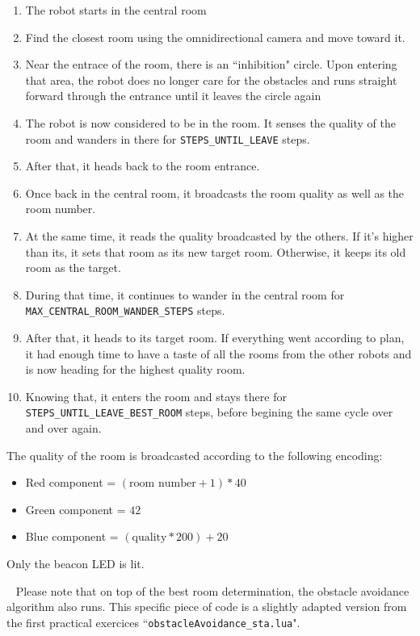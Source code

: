 \documentclass[11pt, a4paper]{article}
\begin{document}
\begin{enumerate}
	\item The robot starts in the central room
	\item Find the closest room using the omnidirectional camera and move toward it.
	\item Near the entrace of the room, there is an ``inhibition" circle. Upon entering that area, the robot does no longer care for the obstacles and runs straight forward through the entrance until it leaves the circle again
	\item The robot is now considered to be in the room. It senses the quality of the room and wanders in there for \texttt{STEPS\_UNTIL\_LEAVE} steps.
	\item After that, it heads back to the room entrance.
	\item Once back in the central room, it broadcasts the room quality as well as the room number.
	\item At the same time, it reads the quality broadcasted by the others. If it's higher than its, it sets that room as its new target room. Otherwise, it keeps its old room as the target.
	\item During that time, it continues to wander in the central room for\newline{} \texttt{MAX\_CENTRAL\_ROOM\_WANDER\_STEPS} steps.
	\item After that, it heads to its target room. If everything went according to plan, it had enough time to have a taste of all the rooms from the other robots and is now heading for the highest quality room.
	\item Knowing that, it enters the room and stays there for\newline{} \texttt{STEPS\_UNTIL\_LEAVE\_BEST\_ROOM} steps, before begining the same cycle over and over again.
\end{enumerate}

The quality of the room is broadcasted according to the following encoding:
\begin{itemize}
	\item Red component = $(\mbox{room number} + 1) * 40$
	\item Green component = $42$
	\item Blue component = $(\mbox{quality}*200)+20$
\end{itemize}
Only the beacon LED is lit.



~\newline{}
Please note that on top of the best room determination, the obstacle avoidance algorithm also runs.
This specific piece of code is a slightly adapted version from the first practical exercices ``\texttt{obstacleAvoidance\_sta.lua}".
\end{document}
